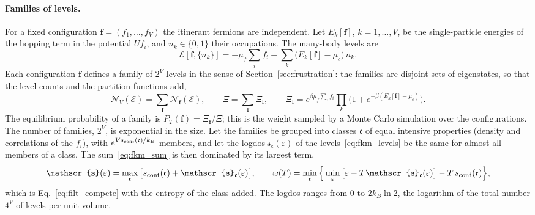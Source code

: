 \documentclass[10pt,a4paper]{article}
\theoremstyle{plain}
\newcommand{\cN}{\mathcal{N}}   %
\newcommand{\lndos}{{logdos}}  %
\newcommand{\enrg}{\mathcal{E}}  %
\newcommand{\lds}{\mathscr{s}}  %
\begin{document}
\paragraph{Families of levels.} For a fixed configuration
$\mathbf f=(f_1,\dots,f_V)$ the itinerant fermions are independent. Let
$E_k[\mathbf f]$, $k=1,\dots,V$, be the single-particle energies of the
hopping term in the potential $Uf_i$, and $n_k\in\{0,1\}$ their occupations.
The many-body levels are
\begin{equation}\label{eq:fkm_levels}
  \enrg[\mathbf f,\{n_k\}]=-\mu_f\sum_if_i+\sum_k\big(E_k[\mathbf f]-\mu_c\big)\,n_k .
\end{equation}
Each configuration $\mathbf f$ defines a family of $2^{V}$ levels in the sense
of Section~\ref{sec:frustration}: the families are disjoint sets of
eigenstates, so that the level counts and the partition functions add,
\begin{equation}\label{eq:fkm_sum}
  \cN_V(\enrg)=\sum_{\mathbf f}\cN_{\mathbf f}(\enrg) ,\qquad
  \Xi=\sum_{\mathbf f}\Xi_{\mathbf f} ,\qquad
  \Xi_{\mathbf f}=e^{\beta\mu_f\sum_if_i}\prod_k\Big(1+e^{-\beta(E_k[\mathbf f]-\mu_c)}\Big) .
\end{equation}
The equilibrium probability of a family is
$P_T(\mathbf f)=\Xi_{\mathbf f}/\Xi$; this is the weight sampled by a Monte
Carlo simulation over the configurations. The number of families, $2^{V}$,
is exponential in the size. Let the families be grouped into classes
$\mathfrak c$ of equal intensive properties (density and correlations of the
$f_i$), with $e^{Vs_{\rm conf}(\mathfrak c)/k_B}$ members, and let the \lndos{}
$\lds_{\mathfrak c}(\varepsilon)$ of the levels~\eqref{eq:fkm_levels} be the
same for almost all members of a class. The sum~\eqref{eq:fkm_sum} is then
dominated by its largest term,
\begin{equation}\label{eq:fkm_s}
  \lds(\varepsilon)=\max_{\mathfrak c}\big[s_{\rm conf}(\mathfrak c)+\lds_{\mathfrak c}(\varepsilon)\big] ,
  \qquad
  \omega(T)=\min_{\mathfrak c}\Big\{\min_\varepsilon\big[\varepsilon-T\lds_{\mathfrak c}(\varepsilon)\big]-T\,s_{\rm conf}(\mathfrak c)\Big\} ,
\end{equation}
which is Eq.~\eqref{eq:filt_compete} with the entropy of the class added. The
\lndos{} ranges from $0$ to $2k_B\ln2$, the logarithm of the total number
$4^{V}$ of levels per unit volume.
\end{document}
